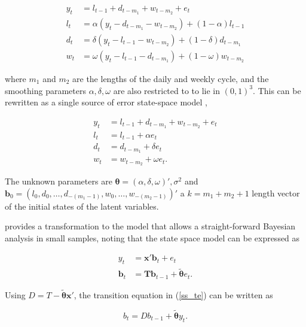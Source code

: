 \documentclass[12pt,a4paper]{article}%
\numberwithin{equation}{section}
\begin{document}
\begin{align}
y_t &= l_{t-1} + d_{t-m_1} + w_{t-m_2} + e_t \label{ds-hw1} \\
l_t &= \alpha (y_t - d_{t-m_1} - w_{t-m_2}) + (1 - \alpha)l_{t-1} \label{ds-hw2}\\
d_t &= \delta (y_t - l_{t-1} - w_{t-m_2}) + (1 - \delta)d_{t-m_1} \label{ds-hw3} \\
w_t &= \omega (y_t - l_{t-1} - d_{t-m_1}) + (1 - \omega)w_{t-m_2} \label{ds-hw4}
\end{align}

where $m_1$ and $m_2$ are the lengths of the daily and weekly cycle, and the smoothing parameters $\alpha, \delta, \omega$ are also restricted to to lie in $(0, 1)^3$. This can be rewritten as a single source of error state-space model \citep{Snyder1985},

\begin{align}
y_t &= l_{t-1} + d_{t-m_1} + w_{t-m_2} + e_t \label{ds-hw-ssoe1} \\
l_t &= l_{t-1} + \alpha e_t \label{ds-hw-ssoe2} \\
d_t &= d_{t-m_1} + \delta e_t \label{ds-hw-ssoe3} \\
w_t &= w_{t-m_2} + \omega e_t \label{ds-hw-ssoe4}. 
\end{align}

The unknown parameters are $\boldsymbol{\theta} = (\alpha, \delta, \omega)', \sigma^2$ and $\boldsymbol{b}_0 = (l_0, d_0, \dots, d_{-(m_1 - 1)}, w_0, \dots, w_{-(m_2 - 1)})'$ a $k = m_1 + m_2 + 1$ length vector of the initial states of the latent variables. 

\citet{Forbes2000} provides a transformation to the model that allows a straight-forward Bayesian analysis in small samples, noting that the state space model can be expressed as

\begin{align}
y_t &= \textbf{x}' \boldsymbol{b}_t + e_t \label{ss_me} \\
\textbf{b}_t &= \textbf{T} \textbf{b}_{t-1} + \tilde{\boldsymbol{\theta}} e_t \label{ss_te}.
\end{align}

Using $D = T - \tilde{\boldsymbol{\theta}} \textbf{x}'$, the transition equation in (\ref{ss_te}) can be written as 

\begin{equation}
b_t = D b_{t-1} + \tilde{\boldsymbol{\theta}} y_t \label{ss_te_2}.
\end{equation}
\end{document}
